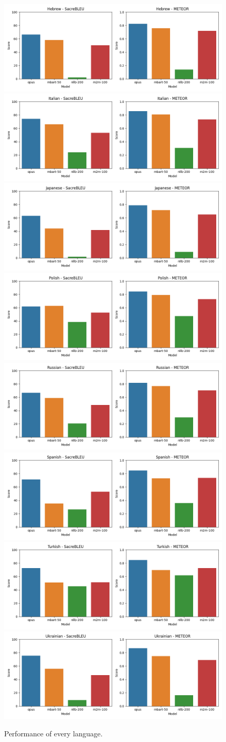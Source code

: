 \documentclass[a4paper, 11pt]{article}
\begin{document}
\begin{figure}[htbp]
    \includegraphics[width=0.49\linewidth]{figures/hebrew_all_metrics.png}
    \includegraphics[width=0.49\linewidth]{figures/italian_all_metrics.png}
    \includegraphics[width=0.49\linewidth]{figures/japanese_all_metrics.png}
    \includegraphics[width=0.49\linewidth]{figures/polish_all_metrics.png}
    \includegraphics[width=0.49\linewidth]{figures/russian_all_metrics.png}
    \includegraphics[width=0.49\linewidth]{figures/spanish_all_metrics.png}
    \includegraphics[width=0.49\linewidth]{figures/turkish_all_metrics.png}
    \includegraphics[width=0.49\linewidth]{figures/ukrainian_all_metrics.png}
    \caption{Performance of every language.}
    \label{fig:lang_metrics}
\end{figure}
\end{document}
